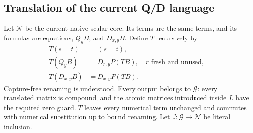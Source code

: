 \documentclass[11pt,letterpaper]{article}
\theoremstyle{definition}\newtheorem{definition}[theorem]{Definition}
\theoremstyle{remark}\newtheorem{remark}[theorem]{Remark}
\newcommand{\CG}{\mathcal G}
\newcommand{\NC}{\mathcal N}
\begin{document}
\subsection{Translation of the current Q/D language}

Let $\NC$ be the current native scalar core. Its terms are the same terms,
and its formulas are equations, $Q_yB$, and $D_{x,y}B$.
Define $T$ recursively by
\[
 \begin{aligned}
 T(s=t)&=(s=t),\\
 T(Q_yB)&=D_{r,y}P(TB),\quad r\text{ fresh and unused},\\
 T(D_{x,y}B)&=D_{x,y}P(TB).
 \end{aligned}                                                   \tag{T}
\]
Capture-free renaming is understood. Every output belongs to $\CG$:
every translated matrix is compound, and the atomic matrices introduced
inside $L$ have the required zero guard. $T$ leaves every numerical term
unchanged and commutes with numerical substitution up to bound renaming.
Let $J:\CG\to\NC$ be literal inclusion.
\end{document}
